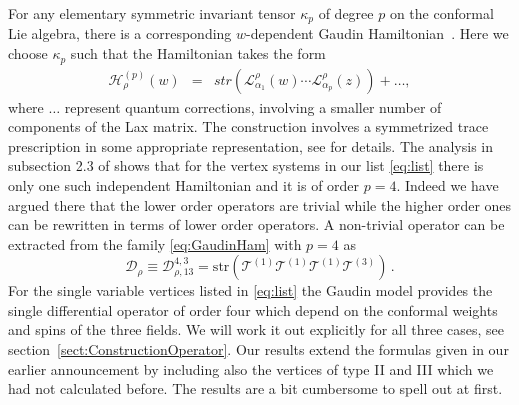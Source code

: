 \documentclass{article}
\def\Lc{\mathcal{L}}
\def\Hc{\mathcal{H}}
\begin{document}
For any elementary symmetric invariant tensor $\kappa_p$ of degree $p$ on the 
conformal Lie algebra, there is a corresponding $w$-dependent Gaudin Hamiltonian~\cite{Gaudin_76a,Gaudin_book83,Feigin:1994in}. 
Here we choose $\kappa_p$ such that the Hamiltonian takes the form 
\begin{eqnarray}\label{eq:GaudinHam}
\Hc^{(p)}_\rho(w) & = & \textit{str} \left( \Lc_{\alpha_1}^\rho(w) \cdots 
\Lc_{\alpha_p}^\rho(z) \right) + \dots,
\end{eqnarray}
where $\dots$ represent quantum corrections, involving a smaller number of 
components of the Lax matrix. The construction involves a symmetrized trace 
prescription in some appropriate representation, see \cite{Buric:2021ywo}
for details. The analysis in subsection 2.3 of \cite{Buric:2021ywo} shows that 
for the vertex systems in our list \eqref{eq:list} there is only one such independent Hamiltonian and it is of order $p=4$. Indeed we have argued there that the 
lower order operators are trivial while the higher order ones can be 
rewritten in terms of lower order operators. A non-trivial operator can be 
extracted from the family \eqref{eq:GaudinHam} with $p=4$ as 
\begin{equation} 
\mathcal{D}_\rho\equiv\mathcal{D}_{\rho,13}^{4,3}=
\text{str}\left(\mathcal{T}^{(1)}\mathcal{T}^{(1)}\mathcal{T}^{(1)}
\mathcal{T}^{(3)}\right)\,.
\label{eq:vertexop} 
\end{equation} 
For the single variable vertices listed in \eqref{eq:list} the Gaudin model 
provides the single differential operator of order four which depend on the 
conformal weights and spins of the three fields. We will work it out 
explicitly for all three cases, see section~\ref{sect:ConstructionOperator}. 
Our results extend the formulas 
given in our earlier announcement \cite{Buric:2020dyz} by including also the 
vertices of type II and III which we had not calculated before. The results 
are a bit cumbersome to spell out at first. 
\end{document}
